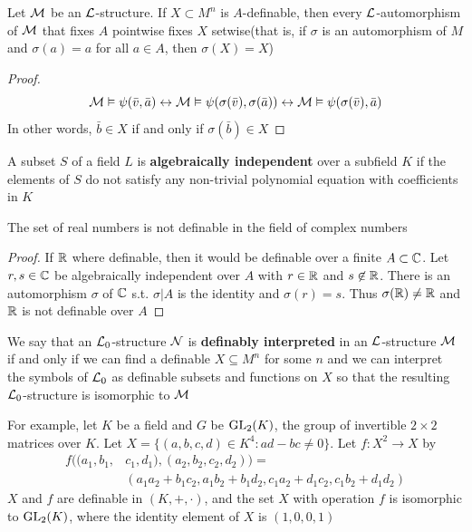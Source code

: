 \documentclass[11pt]{article}
\begin{document}
\begin{proposition}[]
Let \(\mathcal{M}\) be an \(\mathcal{L}\)-structure. If \(X\subset M^n\) is \(A\)-definable,
then every \(\mathcal{L}\)-automorphism of \(\mathcal{M}\) that fixes \(A\) pointwise fixes
\(X\) setwise(that is, if \(\sigma\) is an automorphism of \(M\) and \(\sigma(a)=a\)
for all \(a\in A\), then \(\sigma(X)=X\))
\end{proposition}

\begin{proof}
\begin{equation*}
\mathcal{M}\vDash\psi(\bar{v},\bar{a})\leftrightarrow
\mathcal{M}\vDash\psi(\sigma(\bar{v}),\sigma(\bar{a}))\leftrightarrow
\mathcal{M}\vDash\psi(\sigma(\bar{v}),\bar{a})
\end{equation*}
In other words, \(\bar{b}\in X\) if and only if \(\sigma(\bar{b})\in X\)
\end{proof}

\begin{definition}[]
A subset \(S\) of a field \(L\) is \textbf{algebraically independent} over a
subfield \(K\) if the elements of 
\(S\) do not satisfy any non-trivial polynomial equation with
coefficients in \(K\) 
\end{definition}


\begin{corollary}[]
The set of real numbers is not definable in the field of complex numbers
\end{corollary}

\begin{proof}
If \(\mathbb{R}\) where definable, then it would be definable over a finite
\(A\subset\mathbb{C}\). Let \(r,s\in\mathbb{C}\) be algebraically independent over \(A\) with
\(r\in\mathbb{R}\) and \(s\not\in\mathbb{R}\). There is an automorphism \(\sigma\) of \(\mathbb{C}\) s.t.
\(\sigma|A\) is the identity and \(\sigma(r)=s\). Thus \(\sigma(\mathbb{R})\neq\mathbb{R}\) and
\(\mathbb{R}\) is not definable over \(A\)
\end{proof}

We say that an \(\mathcal{L}_0\)-structure \(\mathcal{N}\) is \textbf{definably interpreted} in
an \(\mathcal{L}\)-structure \(\mathcal{M}\) if and only if we can find a definable
\(X\subseteq M^n\) for some \(n\) and we can interpret the symbols of \(\mathcal{L}_0\)
as definable subsets and functions on \(X\) so that the resulting
\(\mathcal{L}_0\)-structure is isomorphic to \(\mathcal{M}\)


For example, let \(K\) be a field and \(G\) be \(\text{GL}_2(K)\), the group of
invertible \(2\times 2\) matrices over \(K\). Let \(X=\{(a,b,c,d)\in K^4:ad-bc\neq
   0\}\). Let \(f:X^2\to X\) by
\begin{align*}
f((a_1,b_1,&c_1,d_1),(a_2,b_2,c_2,d_2))=\\
&(a_1a_2+b_1c_2,a_1b_2+b_1d_2,c_1a_2+d_1c_2,c_1b_2+d_1d_2)
\end{align*}
\(X\) and \(f\) are definable in \((K,+,\cdot)\), and the set \(X\) with operation
\(f\) is isomorphic to \(\text{GL}_2(K)\), where the identity element of \(X\) is
\((1,0,0,1)\) 
\end{document}
